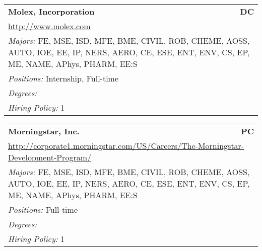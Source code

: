 \documentclass[twoside]{article}
\begin{document}
\begin{center}
\begin{multicols}{3}
\begin{FlushLeft}
\begin{minipage}{\columnwidth}
\end{minipage}
 
\begin{minipage}{\columnwidth}\begin{tabularx}{.95\columnwidth}{Xr}
                 {\Large\bf Molex, Incorporation} & {\Large\bf DC}\\
    \multicolumn{2}{p{.95\columnwidth}}{\url{http://www.molex.com}}\\
    \multicolumn{2}{p{.95\columnwidth}}{\emph{Majors:} FE, MSE, ISD, MFE, BME, CIVIL, ROB, CHEME, AOSS, AUTO, IOE, EE, IP, NERS, AERO, CE, ESE, ENT, ENV, CS, EP, ME, NAME, APhys, PHARM, EE:S}\\
    \multicolumn{2}{p{.95\columnwidth}}{\emph{Positions:} Internship, Full-time}\\
    \multicolumn{2}{p{.95\columnwidth}}{\emph{Degrees:} }\\
    \multicolumn{2}{p{.95\columnwidth}}{\emph{Hiring Policy:} 1}\\
    \end{tabularx}
    
\end{minipage}
 
\begin{minipage}{\columnwidth}\begin{tabularx}{.95\columnwidth}{Xr}
                 {\Large\bf Morningstar, Inc.} & {\Large\bf PC}\\
    \multicolumn{2}{p{.95\columnwidth}}{\url{http://corporate1.morningstar.com/US/Careers/The-Morningstar-Development-Program/}}\\
    \multicolumn{2}{p{.95\columnwidth}}{\emph{Majors:} FE, MSE, ISD, MFE, BME, CIVIL, ROB, CHEME, AOSS, AUTO, IOE, EE, IP, NERS, AERO, CE, ESE, ENT, ENV, CS, EP, ME, NAME, APhys, PHARM, EE:S}\\
    \multicolumn{2}{p{.95\columnwidth}}{\emph{Positions:} Full-time}\\
    \multicolumn{2}{p{.95\columnwidth}}{\emph{Degrees:} }\\
    \multicolumn{2}{p{.95\columnwidth}}{\emph{Hiring Policy:} 1}\\
    \end{tabularx}
    
\end{minipage}
 

\end{FlushLeft}
\end{multicols}
\end{center}
\end{document}
